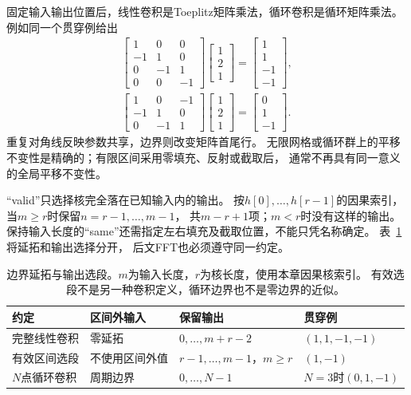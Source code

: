 固定输入输出位置后，线性卷积是Toeplitz矩阵乘法，循环卷积是循环矩阵乘法。
例如同一个贯穿例给出
\begin{gather*}
  \begin{bmatrix}
    1&0&0\\-1&1&0\\0&-1&1\\0&0&-1
  \end{bmatrix}
  \begin{bmatrix}1\\2\\1\end{bmatrix}
  =\begin{bmatrix}1\\1\\-1\\-1\end{bmatrix},\\
  \begin{bmatrix}1&0&-1\\-1&1&0\\0&-1&1\end{bmatrix}
  \begin{bmatrix}1\\2\\1\end{bmatrix}
  =\begin{bmatrix}0\\1\\-1\end{bmatrix}.
\end{gather*}
重复对角线反映参数共享，边界则改变矩阵首尾行。
无限网格或循环群上的平移不变性是精确的；有限区间采用零填充、反射或截取后，
通常不再具有同一意义的全局平移不变性。

“valid”只选择核完全落在已知输入内的输出。
按$h[0],\ldots,h[r-1]$的因果索引，当$m\geq r$时保留$n=r-1,\ldots,m-1$，
共$m-r+1$项；$m<r$时没有这样的输出。
保持输入长度的“same”还需指定左右填充及截取位置，不能只凭名称确定。
表~\ref{tab:signal-boundary-conventions}将延拓和输出选择分开，
后文FFT也必须遵守同一约定。
\begin{table}[!htb]
  \centering
  \begin{tabularx}{\linewidth}{lXXX}
    \toprule
    约定 & 区间外输入 & 保留输出 & 贯穿例\\
    \midrule
    完整线性卷积 & 零延拓 & $0,\ldots,m+r-2$ & $(1,1,-1,-1)$\\
    有效区间选段 & 不使用区间外值 & $r-1,\ldots,m-1$，$m\geq r$ & $(1,-1)$\\
    $N$点循环卷积 & 周期边界 & $0,\ldots,N-1$ & $N=3$时$(0,1,-1)$\\
    \bottomrule
  \end{tabularx}
  \caption{边界延拓与输出选段。$m$为输入长度，$r$为核长度，使用本章因果核索引。
  有效选段不是另一种卷积定义，循环边界也不是零边界的近似。}
  \label{tab:signal-boundary-conventions}
\end{table}

